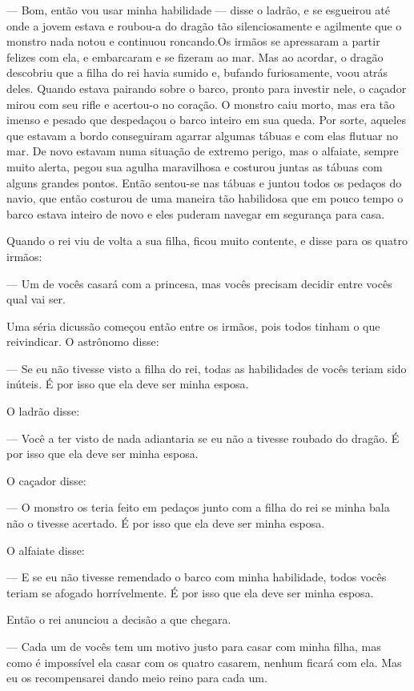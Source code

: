 — Bom, então vou usar minha habilidade — disse o ladrão, e se
esgueirou até onde a jovem estava e roubou-a do dragão tão
silenciosamente e agilmente que o monstro nada notou e continuou
roncando.Os irmãos se apressaram a partir felizes com ela, e
embarcaram e se fizeram ao mar. Mas ao acordar, o dragão descobriu
que a filha do rei havia sumido e, bufando furiosamente, voou atrás
deles. Quando estava pairando sobre o barco, pronto para investir
nele, o caçador mirou com seu rifle e acertou-o no coração. O monstro
caiu morto, mas era tão imenso e pesado que despedaçou o barco
inteiro em sua queda. Por sorte, aqueles que estavam a bordo
conseguiram agarrar algumas tábuas e com elas flutuar no mar. De novo
estavam numa situação de extremo perigo, mas o alfaiate, sempre muito
alerta, pegou sua agulha maravilhosa e costurou juntas as tábuas com
alguns grandes pontos. Então sentou-se nas tábuas e juntou todos os
pedaços do navio, que então costurou de uma maneira tão habilidosa
que em pouco tempo o barco estava inteiro de novo e eles puderam
navegar em segurança para casa.

Quando o rei viu de volta a sua filha, ficou muito contente, e disse
para os quatro irmãos:

— Um de vocês casará com a princesa, mas vocês precisam decidir entre
vocês qual vai ser.

Uma séria dicussão começou então entre os irmãos, pois todos tinham o
que reivindicar. O astrônomo disse:

— Se eu não tivesse visto a filha do rei, todas as habilidades de
vocês teriam sido inúteis. É por isso que ela deve ser minha esposa.

O ladrão disse:

— Você a ter visto de nada adiantaria se eu não a tivesse roubado do
dragão. É por isso que ela deve ser minha esposa.

O caçador disse:

— O monstro os teria feito em pedaços junto com a filha do rei se
minha bala não o tivesse acertado. É por isso que ela deve ser minha
esposa.

O alfaiate disse:

— E se eu não tivesse remendado o barco com minha habilidade, todos
vocês teriam se afogado horrívelmente. É por isso que ela deve ser
minha esposa.

Então o rei anunciou a decisão a que chegara.

— Cada um de vocês tem um motivo justo para casar com minha filha, mas
como é impossível ela casar com os quatro casarem, nenhum ficará com
ela. Mas eu os recompensarei dando meio reino para cada um.

